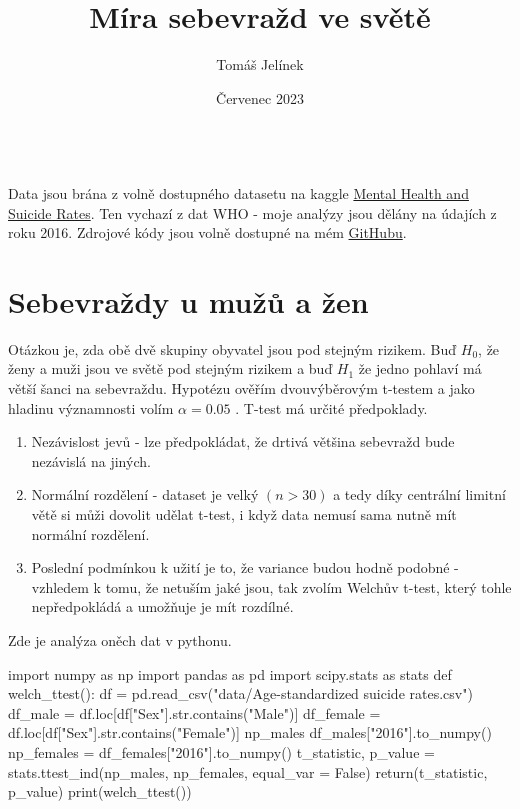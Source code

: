 \documentclass[12pt]{article}
\title{Míra sebevražd ve světě}
\author{Tomáš Jelínek}
\date{Červenec 2023}
\begin{document}
\maketitle
{}\\

Data jsou brána z volně dostupného datasetu na kaggle \href{https://www.kaggle.com/datasets/twinkle0705/mental-health-and-suicide-rates?select=Facilities.csv}{Mental Health and Suicide Rates}. Ten vychazí z dat WHO - moje analýzy jsou dělány na údajích z roku 2016. Zdrojové kódy jsou volně dostupné na mém \href{https://github.com/Desperadus/PaST-Zapoctak}{GitHubu}.

\section{Sebevraždy u mužů a žen}
Otázkou je, zda obě dvě skupiny obyvatel jsou pod stejným rizikem. Buď $H_0$, že ženy a muži jsou ve světě pod stejným rizikem a buď $H_1$ že jedno pohlaví má větší šanci na sebevraždu. Hypotézu ověřím dvouvýběrovým t-testem a jako hladinu významnosti volím $\alpha = 0.05$ . T-test má určité předpoklady.
\begin{enumerate}
\item Nezávislost jevů - lze předpokládat, že drtivá většina sebevražd bude nezávislá na jiných.
\item Normální rozdělení - dataset je velký $(n > 30)$ a tedy díky centrální limitní větě si můži dovolit udělat t-test, i když data nemusí sama nutně mít normální rozdělení.
\item Poslední podmínkou k užití je to, že variance budou hodně podobné - vzhledem k tomu, že netuším jaké jsou, tak zvolím Welchův t-test, který tohle nepředpokládá a umožňuje je mít rozdílné.
\end{enumerate}

\newpage
Zde je analýza oněch dat v pythonu.
\begin{python}
import numpy as np
import pandas as pd
import scipy.stats as stats
def welch_ttest():
		df = pd.read_csv("data/Age-standardized suicide rates.csv")
    df_male = df.loc[df["Sex"].str.contains("Male")]
    df_female = df.loc[df["Sex"].str.contains("Female")]
    np_males df_males["2016"].to_numpy()
    np_females = df_females["2016"].to_numpy()
    t_statistic, p_value = stats.ttest_ind(np_males, np_females, equal_var = False)
    return(t_statistic, p_value)
print(welch_ttest())
\end{python}
\end{document}
